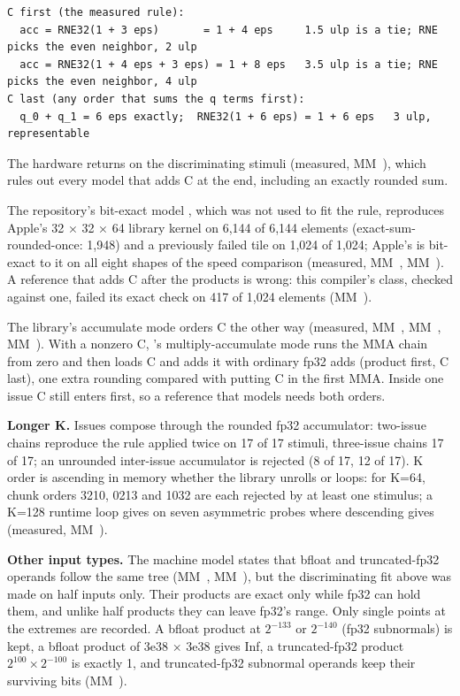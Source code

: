 \begin{lstlisting}
C first (the measured rule):
  acc = RNE32(1 + 3 eps)       = 1 + 4 eps     1.5 ulp is a tie; RNE picks the even neighbor, 2 ulp
  acc = RNE32(1 + 4 eps + 3 eps) = 1 + 8 eps   3.5 ulp is a tie; RNE picks the even neighbor, 4 ulp
C last (any order that sums the q terms first):
  q_0 + q_1 = 6 eps exactly;  RNE32(1 + 6 eps) = 1 + 6 eps   3 ulp, representable
\end{lstlisting}

The hardware returns  on the discriminating stimuli (measured, MM~), which rules out every
model that adds C at the end, including an exactly rounded sum.

The repository's bit-exact model , which was not used to fit the rule, reproduces Apple's 32 × 32 × 64 library kernel on 6,144 of 6,144
elements (exact-sum-rounded-once: 1,948) and a previously failed tile on 1,024 of 1,024; Apple's  is
bit-exact to it on all eight shapes of the speed comparison (measured, MM~, MM~). A reference that
adds C after the products is wrong: this compiler's  class, checked against one, failed its exact check
on 417 of 1,024 elements (MM~).

The library's accumulate mode orders C the other way (measured,
MM~, MM~, MM~). With a nonzero C, 's
multiply-accumulate mode runs the MMA chain from zero and then loads C and adds it with ordinary fp32 adds (product
first, C last), one extra rounding compared with putting C in the first MMA. Inside one issue C still enters first, so a reference
that models  needs both orders.

\textbf{Longer K.} Issues compose through the rounded fp32 accumulator: two-issue chains
reproduce the rule applied twice on 17 of 17 stimuli, three-issue chains 17 of 17; an unrounded inter-issue
accumulator is rejected (8 of 17, 12 of 17). K order is ascending in memory whether the library unrolls or loops: for
K=64, chunk orders 3210, 0213 and 1032 are each rejected by at least one stimulus; a K=128 runtime loop gives
 on seven asymmetric probes where descending gives  (measured, MM~).

\textbf{Other input types.} The machine model states that bfloat and truncated-fp32
operands follow the same tree (MM~, MM~), but the discriminating fit above was made on half inputs only.
Their products are exact only while fp32 can hold them, and unlike half products they can leave fp32's range. Only
single points at the extremes are recorded. A bfloat product at $2^{-133}$ or $2^{-140}$ (fp32 subnormals) is
kept, a bfloat product of 3e38 × 3e38 gives Inf, a truncated-fp32 product $2^{100} \times 2^{-100}$ is exactly 1, and
truncated-fp32 subnormal operands keep their surviving bits (MM~).

